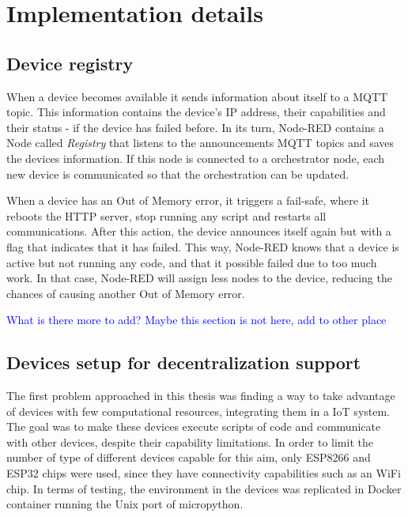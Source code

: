 \section{Implementation details}\label{sec:implementation_details}

\subsection{Device registry}\label{sec:registry}

When a device becomes available it sends information about itself to a MQTT topic. This information contains the device's IP address, their capabilities and their status - if the device has failed before. In its turn, Node-RED contains a Node called \textit{Registry} that listens to the announcements MQTT topics and saves the devices information. If this node is connected to a orchestrator node, each new device is communicated so that the orchestration can be updated.

When a device has an Out of Memory error, it triggers a fail-safe, where it reboots the HTTP server, stop running any script and restarts all communications. After this action, the device announces itself again but with a flag that indicates that it has failed. This way, Node-RED knows that a device is active but not running any code, and that it possible failed due to too much work. In that case, Node-RED will assign less nodes to the device, reducing the chances of causing another Out of Memory error.

\textcolor{blue}{What is there more to add? Maybe this section is not here, add to other place}

\subsection{Devices setup for decentralization support}\label{sec:devices_decentralization}

The first problem approached in this thesis was finding a way to take advantage of devices with few computational resources, integrating them in a IoT system. The goal was to make these devices execute scripts of code and communicate with other devices, despite their capability limitations. In order to limit the number of type of different devices capable for this aim, only ESP8266 and ESP32 chips were used, since they have connectivity capabilities such as an WiFi chip. In terms of testing, the environment in the devices was replicated in Docker container running the Unix port of micropython.

